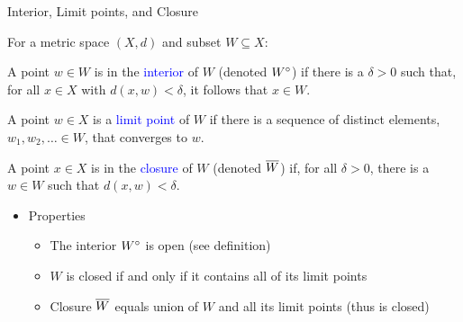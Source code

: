 \documentclass[10pt,english]{beamer}
\begin{document}
\begin{frame}{Interior, Limit points, and Closure}

For a metric space $(X,d)$ and subset $W \subseteq X$:

\begin{definition}
A point $w\in W$ is in the \textcolor{blue}{interior} of $W$ (denoted ${W}^{\circ}$) if there is a $\delta >0$ such that, for all $x\in X$ with $d(x,w)<\delta$, it follows that $x\in W$.
\end{definition}

\begin{definition}
A point $w\in X$ is a \textcolor{blue}{limit point} of $W$ if there is a sequence of distinct elements, $w_1,w_2,\ldots\in W$, that converges to $w$.
\end{definition}

\begin{definition}
A point $x\in X$ is in the \textcolor{blue}{closure} of $W$ (denoted $\overline{W}$) if, for all $\delta >0$, there is a $w\in W$ such that $d(x,w)<\delta$.
\end{definition}

\begin{itemize}
\setlength\itemsep{3mm}
\item<1-> Properties \vspace{1mm}
\begin{itemize} 
  \setlength\itemsep{1.5mm}
  \item The interior ${W}^{\circ}$ is open (see definition)
  \item $W$ is closed if and only if it contains all of its limit points
  \item Closure $\overline{W}$ equals union of $W$ and all its limit points (thus is closed)
\end{itemize}
\end{itemize}

\end{frame}
\end{document}
